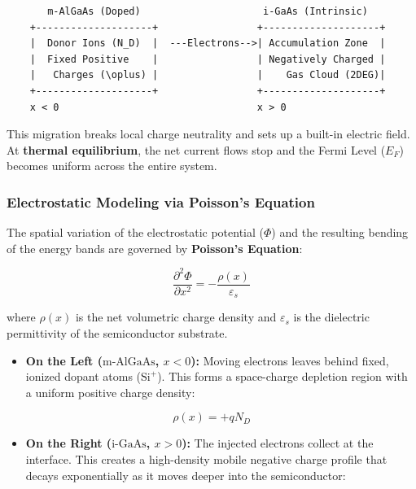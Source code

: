 \documentclass[
]{article}
\providecommand{\tightlist}{%
  \setlength{\itemsep}{0pt}\setlength{\parskip}{0pt}}
\begin{document}
\begin{verbatim}
       m-AlGaAs (Doped)                     i-GaAs (Intrinsic)
    +--------------------+                 +--------------------+
    |  Donor Ions (N_D)  |  ---Electrons-->| Accumulation Zone  |
    |  Fixed Positive    |                 | Negatively Charged |
    |   Charges (\oplus) |                 |    Gas Cloud (2DEG)|
    +--------------------+                 +--------------------+
    x < 0                                  x > 0
\end{verbatim}

This migration breaks local charge neutrality and sets up a built-in
electric field. At \textbf{thermal equilibrium}, the net current flows
stop and the Fermi Level (\(E_F\)) becomes uniform across the entire
system.

\subsubsection{Electrostatic Modeling via Poisson's
Equation}\label{electrostatic-modeling-via-poissons-equation}

The spatial variation of the electrostatic potential (\(\Phi\)) and the
resulting bending of the energy bands are governed by \textbf{Poisson's
Equation}:

\[\frac{\partial^2 \Phi}{\partial x^2} = -\frac{\rho(x)}{\varepsilon_s}\]

where \(\rho(x)\) is the net volumetric charge density and
\(\varepsilon_s\) is the dielectric permittivity of the semiconductor
substrate.

\begin{itemize}
\tightlist
\item
  \textbf{On the Left (\(\text{m-AlGaAs}\), \(x < 0\)):} Moving
  electrons leaves behind fixed, ionized dopant atoms (\(\text{Si}^+\)).
  This forms a space-charge depletion region with a uniform positive
  charge density:
\end{itemize}

\[\rho(x) = +qN_D\]

\begin{itemize}
\tightlist
\item
  \textbf{On the Right (\(\text{i-GaAs}\), \(x > 0\)):} The injected
  electrons collect at the interface. This creates a high-density mobile
  negative charge profile that decays exponentially as it moves deeper
  into the semiconductor:
\end{itemize}
\end{document}
